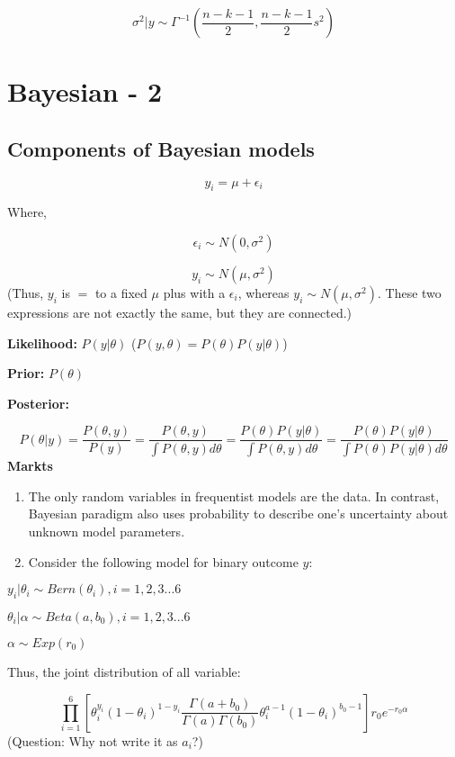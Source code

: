 \documentclass[]{book}
\begin{document}
\[\sigma^2|y \sim \Gamma^{-1}(\frac{n-k-1}{2},\frac{n-k-1}{2}s^2)\]

\hypertarget{bayesian---2}{%
\chapter{Bayesian - 2}\label{bayesian---2}}

\hypertarget{components-of-bayesian-models}{%
\section{Components of Bayesian models}\label{components-of-bayesian-models}}

\[y_i=\mu+\epsilon_i\]

Where,

\[\epsilon_i \sim N(0, \sigma^2)\]

\[y_i \sim N(\mu, \sigma^2)\]
(Thus, \(y_i\) is \(=\) to a fixed \(\mu\) plus with a \(\epsilon_i\), whereas \(y_i \sim N(\mu, \sigma^2)\). These two expressions are not exactly the same, but they are connected.)

\textbf{Likelihood:} \(P(y|\theta)\) (\(P(y,\theta)=P(\theta)P(y|\theta)\))

\textbf{Prior:} \(P(\theta)\)

\textbf{Posterior:}

\[P(\theta|y)=\frac{P(\theta, y)}{P(y)}=\frac{P(\theta, y)}{\int P(\theta, y)d\theta}=\frac{P(\theta)P(y|\theta)}{\int P(\theta, y)d\theta}=\frac{P(\theta)P(y|\theta)}{\int P(\theta)P(y|\theta)d\theta}\]
\textbf{Markts}

\begin{enumerate}
\def\labelenumi{(\arabic{enumi})}
\item
  The only random variables in frequentist models are the data. In contrast, Bayesian paradigm also uses probability to describe one's uncertainty about unknown model parameters.
\item
  Consider the following model for binary outcome \(y\):
\end{enumerate}

\(y_i|\theta_i \sim Bern (\theta_i), i=1,2,3...6\)

\(\theta_i |\alpha \sim Beta(a, b_0), i=1,2,3...6\)

\(\alpha \sim Exp(r_0)\)

Thus, the joint distribution of all variable:

\[\prod_{i=1}^{6}[\theta_i^{y_i}(1-\theta_i)^{1-y_i}\frac{\Gamma(a+b_0)}{\Gamma(a)\Gamma(b_0)}\theta_i^{a-1}(1-\theta_i)^{b_0-1}]r_0e^{-r_0 \alpha}\]
(Question: Why not write it as \(a_i\)?)
\end{document}
